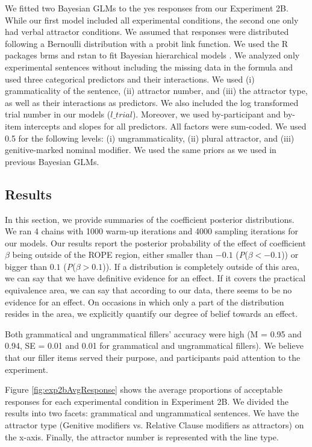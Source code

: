 We fitted two Bayesian GLMs to the yes responses from our Experiment 2B. While our first model included all experimental conditions, the second one only had verbal attractor conditions. We assumed that responses were distributed following a Bernoulli distribution with a probit link function. We used the R packages brms \citep{R-brms_a,R-brms_b} and rstan \citep{R-rstan} to fit Bayesian hierarchical models \citep[e.g.,][]{GelmanHill:2007, NicenboimVasishth:2016}. We analyzed only experimental sentences without including the missing data in the formula and used three categorical predictors and their interactions. We used (i) grammaticality of the sentence, (ii) attractor number, and (iii) the attractor type, as well as their interactions as predictors. We also included the log transformed trial number in our models ($l\_trial$). Moreover, we used by-participant and by-item intercepts and slopes for all predictors. All factors were sum-coded. We used 0.5 for the following levels: (i) ungrammaticality, (ii) plural attractor, and (iii) genitive-marked nominal modifier. We used the same priors as we used in previous Bayesian GLMs.

\subsection{Results}

In this section, we provide summaries of the coefficient posterior distributions. We ran 4 chains with 1000 warm-up iterations and 4000 sampling iterations for our models. Our results report the posterior probability of the effect of coefficient $\beta$ being outside of the ROPE region, either smaller than $-0.1$ (\emph{P}($\beta < -0.1$)) or bigger than $0.1$ (\emph{P}($\beta > 0.1$)). If a distribution is completely outside of this area, we can say that we have definitive evidence for an effect. If it covers the practical equivalence area, we can say that according to our data, there seems to be no evidence for an effect. On occasions in which only a part of the distribution resides in the area, we explicitly quantify our degree of belief towards an effect.

Both grammatical and ungrammatical fillers' accuracy were high (M = 0.95 and 0.94, SE = 0.01 and 0.01 for grammatical and ungrammatical fillers). We believe that our filler items served their purpose, and participants paid attention to the experiment. 

Figure \ref{fig:exp2bAvgResponse} shows the average proportions of acceptable responses for each experimental condition in Experiment 2B. We divided the results into two facets: grammatical and ungrammatical sentences. We have the attractor type (Genitive modifiers vs. Relative Clause modifiers as attractors) on the x-axis. Finally, the attractor number is represented with the line type. 

